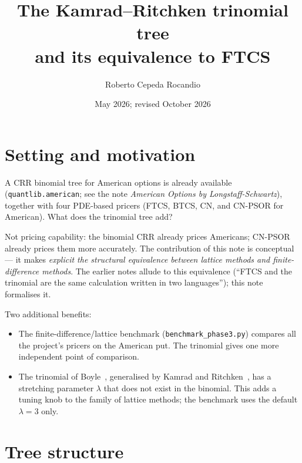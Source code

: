 \documentclass[11pt,a4paper]{article}
\title{The Kamrad--Ritchken trinomial tree\\and its equivalence to FTCS}
\author{Roberto Cepeda Rocandio}
\date{May 2026; revised October 2026}
\begin{document}
\maketitle

\section{Setting and motivation}

A CRR binomial tree for American options is already available
(\texttt{quantlib.american}; see the note \emph{American Options by
Longstaff-Schwartz}), together with four PDE-based pricers (FTCS, BTCS, CN,
and CN-PSOR for American). What does the trinomial tree add?

Not pricing capability: the binomial CRR already prices Americans;
CN-PSOR already prices them more accurately. The contribution of
this note is conceptual --- it makes \emph{explicit the structural
equivalence between lattice methods and finite-difference
methods}. The earlier notes allude to this equivalence
(``FTCS and the trinomial are the same calculation written in two
languages''); this note formalises it.

Two additional benefits:
\begin{itemize}[leftmargin=2em]
\item The finite-difference/lattice benchmark (\texttt{benchmark\_phase3.py}) compares all the project's pricers on the
American put. The trinomial gives one more independent point of
comparison.
\item The trinomial of Boyle~\cite{Boyle1986}, generalised by Kamrad
and Ritchken~\cite{KR1991}, has a stretching parameter $\lambda$ that
does not exist in the binomial. This adds a tuning knob to the family
of lattice methods; the benchmark uses the default $\lambda = 3$ only.
\end{itemize}

\section{Tree structure}
\end{document}
